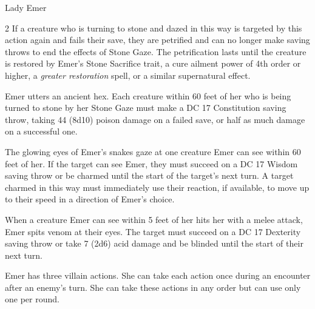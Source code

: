 \documentclass[10pt,a4paper,twoside,bg=print,twocolumn,openany,nodeprecatedcode]{dndbook}
\begin{document}
\begin{DndMonster}[float*=b,width=\textwidth + 8pt]{Lady Emer}
\begin{multicols}{2}
If a creature who is turning to stone and dazed in this way is targeted by this action again and fails their save, they are petrified and can no longer make saving throws to end the effects of Stone Gaze. The petrification lasts until the creature is restored by Emer's Stone Sacrifice trait, a cure ailment power of 4th order or higher, a \textit{greater restoration} spell, or a similar supernatural effect.

Emer utters an ancient hex. Each creature within 60 feet of her who is being turned to stone by her Stone Gaze must make a DC 17 Constitution saving throw, taking 44 (8d10) poison damage on a failed save, or half as much damage on a successful one.

The glowing eyes of Emer's snakes gaze at one creature Emer can see within 60 feet of her. If the target can see Emer, they must succeed on a DC 17 Wisdom saving throw or be charmed until the start of the target's next turn. A target charmed in this way must immediately use their reaction, if available, to move up to their speed in a direction of Emer's choice.

When a creature Emer can see within 5 feet of her hits her with a melee attack, Emer spits venom at their eyes. The target must succeed on a DC 17 Dexterity saving throw or take 7 (2d6) acid damage and be blinded until the start of their next turn.

Emer has three villain actions. She can take each action once during an encounter after an enemy's turn. She can take these actions in any order but can use only one per round.

\begin{DndMonsterLegendaryActions}
\end{DndMonsterLegendaryActions}
\end{multicols}
\end{DndMonster}
\end{document}
